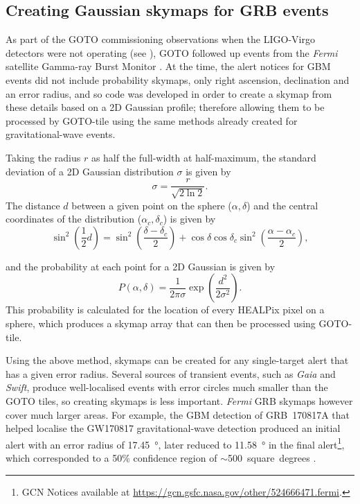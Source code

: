 \subsection{Creating Gaussian skymaps for GRB events}
\label{sec:grb_skymaps}
\begin{colsection}

As part of the GOTO commissioning observations when the LIGO-Virgo detectors were not operating (see ), GOTO followed up  events from the \textit{Fermi} satellite Gamma-ray Burst Monitor \citep[GBM;][]{Fermi_GBM}. At the time, the alert notices for GBM events did not include probability skymaps, only right ascension, declination and an error radius, and so code was developed in order to create a skymap from these details based on a 2D Gaussian profile; therefore allowing them to be processed by GOTO-tile using the same methods already created for gravitational-wave events.

Taking the radius $r$ as half the full-width at half-maximum, the standard deviation of a 2D Gaussian distribution $\sigma$ is given by
%
\begin{equation}
    \sigma = \frac{r}{\sqrt{2 \ln 2}}.
    \label{eq:gaussian_sigma}
\end{equation}
%
The distance $d$ between a given point on the sphere ($\alpha, \delta$) and the central coordinates of the distribution ($\alpha_c, \delta_c$) is given by
%
\begin{equation}
    \sin^2 \left ( \frac{1}{2} d \right )
    = \sin^2 \left ( \frac{\delta-\delta_c}{2} \right)
      + \cos \delta \cos \delta_c \sin^2 \left ( \frac{\alpha-\alpha_c}{2} \right),
    \label{eq:gaussian_distance}
\end{equation}

\noindent and the probability at each point for a 2D Gaussian is given by
%
\begin{equation}
    P(\alpha, \delta) = \frac{1}{2\pi\sigma} \exp \left ( \frac{d^2}{2\sigma^2} \right ).
    \label{eq:gaussian_prob}
\end{equation}
%
This probability is calculated for the location of every HEALPix pixel on a sphere, which produces a skymap array that can then be processed using GOTO-tile.

Using the above method, skymaps can be created for any single-target alert that has a given error radius. Several sources of transient events, such as \textit{Gaia} and \textit{Swift}, produce well-localised events with error circles much smaller than the GOTO tiles, so creating skymaps is less important. \textit{Fermi} GRB skymaps however cover much larger areas. For example, the GBM detection of GRB~170817A that helped localise the GW170817 gravitational-wave detection produced an initial alert with an error radius of \SI{17.45}{\degree}, later reduced to \SI{11.58}{\degree} in the final alert\footnote{GCN Notices available at \url{https://gcn.gsfc.nasa.gov/other/524666471.fermi}.}, which corresponded to a 50\% confidence region of $\sim$500~square~degrees \citep{GW170817_Fermi}.


\end{colsection}
